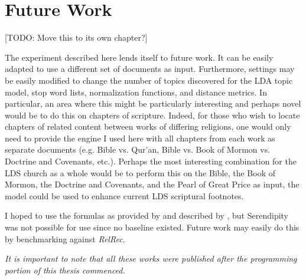 \section{Future Work}

[TODO: Move this to its own chapter?]

The experiment described here lends itself to future work. It can be easily adapted to use a different set of documents as input. Furthermore, settings may be easily modified to change the number of topics discovered for the LDA topic model, stop word lists, normalization functions, and distance metrics. In particular, an area where this might be particularly interesting and perhaps novel would be to do this on chapters of scripture. Indeed, for those who wish to locate chapters of related content between works of differing religions, one would only need to provide the engine I used here with all chapters from each work as separate documents (e.g. Bible vs. Qur'an, Bible vs. Book of Mormon vs. Doctrine and Covenants, etc.). Perhaps the most interesting combination for the LDS church as a whole would be to perform this on the Bible, the Book of Mormon, the Doctrine and Covenants, and the Pearl of Great Price as input, the model could be used to enhance current LDS scriptural footnotes.

I hoped to use the formulas as provided by and described by \cite{Ge:2010:BAE:1864708.1864761}, but Serendipity was not possible for use since no baseline existed. Future work may easily do this by benchmarking against \textit{RelRec}.

\textit{It is important to note that all these works \citep{arora2013practical,arora2012learning} were published after the programming portion of this thesis commenced.} %